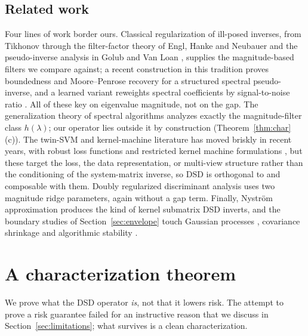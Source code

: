 \documentclass[preprint,12pt]{elsarticle}
\begin{document}
\subsection{Related work}
Four lines of work border ours. Classical regularization of ill-posed inverses, from Tikhonov
\cite{tikhonov1963} through the filter-factor theory of Engl, Hanke and Neubauer
\cite{engl1996regularization} and the pseudo-inverse analysis in Golub and Van Loan
\cite{golub2013matrix}, supplies the magnitude-based filters we compare against; a recent construction
in this tradition \cite{chen2026spectral} proves boundedness and Moore--Penrose recovery for a
structured spectral pseudo-inverse, and a learned variant reweights spectral coefficients by
signal-to-noise ratio \cite{scnet2026}. All of these key on eigenvalue magnitude, not on the gap. The
generalization theory of spectral algorithms \cite{velikanov2024spectral} analyzes exactly the
magnitude-filter class $h(\lambda)$; our operator lies outside it by construction
(Theorem~\ref{thm:char}(c)). The twin-SVM and kernel-machine literature has moved briskly in recent
years, with robust loss functions \cite{akhtar2024wave} and restricted kernel machine formulations
\cite{quadir2025trkm}, but these target the loss, the data representation, or multi-view structure
rather than the conditioning of the system-matrix inverse, so DSD is orthogonal to and composable with
them. Doubly regularized discriminant analysis \cite{r2lda2020} uses two magnitude ridge parameters,
again without a gap term. Finally, Nystr\"om approximation \cite{williams2001nystrom} produces the
kind of kernel submatrix DSD inverts, and the boundary studies of Section~\ref{sec:envelope} touch
Gaussian processes \cite{rasmussen2006gp}, covariance shrinkage \cite{ledoit2004shrinkage,ledoit2020nonlinear}
and algorithmic stability \cite{bousquet2002stability}.

\section{A characterization theorem}
\label{sec:theory}

We prove what the DSD operator \emph{is}, not that it lowers risk. The attempt to prove a risk
guarantee failed for an instructive reason that we discuss in Section~\ref{sec:limitations}; what
survives is a clean characterization.
\end{document}

